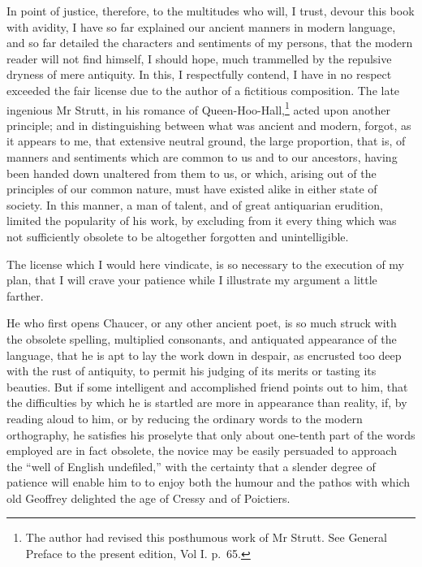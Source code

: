 In point of justice, therefore, to the multitudes who will, I trust,
devour this book with avidity, I have so far explained our ancient
manners in modern language, and so far detailed the characters and
sentiments of my persons, that the modern reader will not find himself,
I should hope, much trammelled by the repulsive dryness of mere
antiquity. In this, I respectfully contend, I have in no respect
exceeded the fair license due to the author of a fictitious composition.
The late ingenious Mr Strutt, in his romance of
Queen-Hoo-Hall,\footnote{The author had revised this posthumous work
of Mr Strutt. See General Preface to the present edition, Vol I. p.~65.}
acted upon another principle; and in distinguishing between what was
ancient and modern, forgot, as it appears to me, that extensive neutral
ground, the large proportion, that is, of manners and sentiments which
are common to us and to our ancestors, having been handed down unaltered
from them to us, or which, arising out of the principles of our common
nature, must have existed alike in either state of society. In this
manner, a man of talent, and of great antiquarian erudition, limited the
popularity of his work, by excluding from it every thing which was not
sufficiently obsolete to be altogether forgotten and unintelligible.

The license which I would here vindicate, is so necessary to the
execution of my plan, that I will crave your patience while I illustrate
my argument a little farther.

He who first opens Chaucer, or any other ancient poet, is so much struck
with the obsolete spelling, multiplied consonants, and antiquated
appearance of the language, that he is apt to lay the work down in
despair, as encrusted too deep with the rust of antiquity, to permit his
judging of its merits or tasting its beauties. But if some intelligent
and accomplished friend points out to him, that the difficulties by
which he is startled are more in appearance than reality, if, by reading
aloud to him, or by reducing the ordinary words to the modern
orthography, he satisfies his proselyte that only about one-tenth part
of the words employed are in fact obsolete, the novice may be easily
persuaded to approach the ``well of English undefiled,'' with the
certainty that a slender degree of patience will enable him to to enjoy
both the humour and the pathos with which old Geoffrey delighted the age
of Cressy and of Poictiers.

